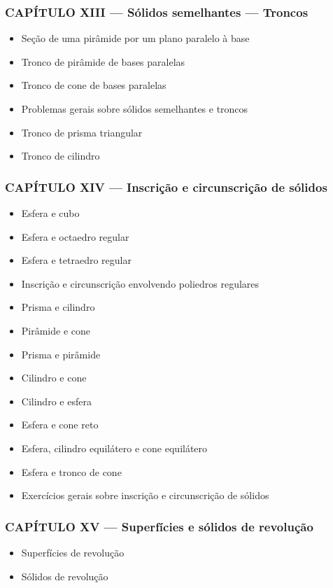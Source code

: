 \documentclass[a4paper,12pt]{article}[abntex2]
\begin{document}
\subsubsection*{CAPÍTULO XIII — Sólidos semelhantes — Troncos}

\begin{itemize}
\item Seção de uma pirâmide por um plano paralelo à base
\item Tronco de pirâmide de bases paralelas
\item Tronco de cone de bases paralelas
\item Problemas gerais sobre sólidos semelhantes e troncos
\item Tronco de prisma triangular
\item Tronco de cilindro
\end{itemize}
\subsubsection*{CAPÍTULO XIV — Inscrição e circunscrição de sólidos}

\begin{itemize}
\item Esfera e cubo
\item Esfera e octaedro regular
\item Esfera e tetraedro regular
\item Inscrição e circunscrição envolvendo poliedros regulares
\item Prisma e cilindro
\item Pirâmide e cone
\item Prisma e pirâmide
\item Cilindro e cone
\item Cilindro e esfera
\item Esfera e cone reto
\item Esfera, cilindro equilátero e cone equilátero
\item Esfera e tronco de cone
\item Exercícios gerais sobre inscrição e circunscrição de sólidos
\end{itemize}
\subsubsection*{CAPÍTULO XV — Superfícies e sólidos de revolução}

\begin{itemize}
\item Superfícies de revolução
\item Sólidos de revolução
\end{itemize}
\end{document}
